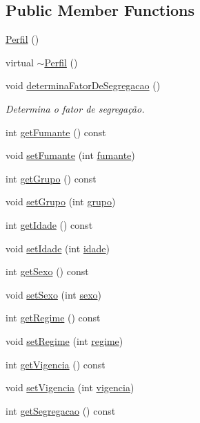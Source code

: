 \subsection*{Public Member Functions}
\begin{DoxyCompactItemize}
\item 
\hyperlink{class_perfil_a7d33c31b4d676edb7d5e5ff2905ce0c0}{Perfil} ()
\item 
virtual \hyperlink{class_perfil_a23978d891d08e7e8b4547849429eacec}{$\sim$\+Perfil} ()
\item 
void \hyperlink{class_perfil_ae3e87c88b74f8f1ac18a9fb79906d7bf}{determina\+Fator\+De\+Segregacao} ()
\begin{DoxyCompactList}\small\item\em Determina o fator de segregação. \end{DoxyCompactList}\item 
int \hyperlink{class_perfil_a235697fa0afc9536654196e7651393dd}{get\+Fumante} () const
\item 
void \hyperlink{class_perfil_ad1eda80a3ead2aab4fb6ee4a87420dce}{set\+Fumante} (int \hyperlink{class_perfil_a4ced26fed0c87e3fa425bc3d7e8cdc87}{fumante})
\item 
int \hyperlink{class_perfil_a4d7f7fd4f521e3054fd78ef180c2ef3b}{get\+Grupo} () const
\item 
void \hyperlink{class_perfil_a171fbb4fd0041f932ce6505ff146325d}{set\+Grupo} (int \hyperlink{class_perfil_ad6408bcf9e079be0f8d5df42c0d9a080}{grupo})
\item 
int \hyperlink{class_perfil_a384c2efb684010011a4a42520433c03a}{get\+Idade} () const
\item 
void \hyperlink{class_perfil_a2ba0e4d30dab55c5ef3ab1dbfcb6f95f}{set\+Idade} (int \hyperlink{class_perfil_a310f83d33bf7be6a42b8c91d767e3597}{idade})
\item 
int \hyperlink{class_perfil_a67a0adbb4f1364c53e10c096b6ae6fc4}{get\+Sexo} () const
\item 
void \hyperlink{class_perfil_ab9b481a1fc16ab6534e450b34e5f61fc}{set\+Sexo} (int \hyperlink{class_perfil_a811437646338aa346006d4edd7fda9e0}{sexo})
\item 
int \hyperlink{class_perfil_ab01922cd35d36b06d408956865650ab6}{get\+Regime} () const
\item 
void \hyperlink{class_perfil_ab292bc51eb2c229dabb79ca5788d2f61}{set\+Regime} (int \hyperlink{class_perfil_a4194b50257455f7c9d7c92555344ed47}{regime})
\item 
int \hyperlink{class_perfil_a75774f6d3b07d76780d638f4e2660e53}{get\+Vigencia} () const
\item 
void \hyperlink{class_perfil_aefc002d90218c1703a7cf26679480086}{set\+Vigencia} (int \hyperlink{class_perfil_ad5fdbf33a924b01cb3e30c364fde8a56}{vigencia})
\item 
int \hyperlink{class_perfil_a4ffc0651290f190979139cd06cf635ac}{get\+Segregacao} () const
\end{DoxyCompactItemize}
